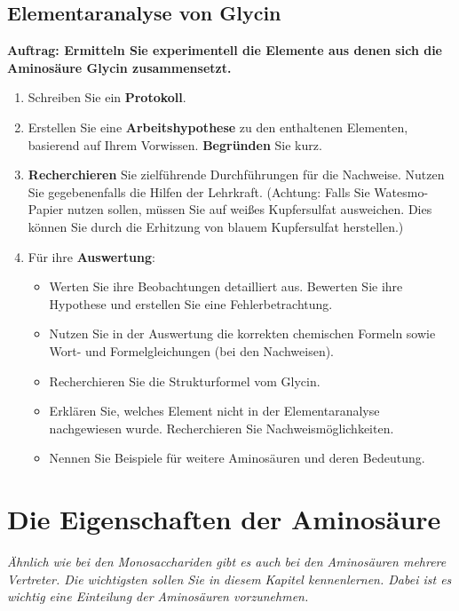 \documentclass{scrartcl}  %
\begin{document}
\newpage
	
		\subsection{Elementaranalyse von Glycin}
		
			\textbf{Auftrag: Ermitteln Sie experimentell die Elemente aus denen sich die Aminosäure Glycin zusammensetzt.}
			
			\begin{enumerate}
				\item Schreiben Sie ein \textbf{Protokoll}.
	    		\item Erstellen Sie eine \textbf{Arbeitshypothese} zu den enthaltenen Elementen, basierend auf Ihrem Vorwissen. \textbf{Begründen} Sie kurz.
	    		\item \textbf{Recherchieren} Sie zielführende Durchführungen für die Nachweise. Nutzen Sie gegebenenfalls die Hilfen der Lehrkraft. (Achtung: Falls Sie Watesmo-Papier nutzen sollen, müssen Sie auf weißes Kupfersulfat ausweichen. Dies können Sie durch die Erhitzung von blauem Kupfersulfat herstellen.)
	    		\item Für ihre \textbf{Auswertung}:
	        	\begin{itemize}
	        		\item Werten Sie ihre Beobachtungen detailliert aus. Bewerten Sie ihre Hypothese und erstellen Sie eine Fehlerbetrachtung. 
	        		\item Nutzen Sie in der Auswertung die korrekten chemischen Formeln sowie Wort- und Formelgleichungen (bei den Nachweisen).
	        		\item Recherchieren Sie die Strukturformel vom Glycin.
	        		\item Erklären Sie, welches Element nicht in der Elementaranalyse nachgewiesen wurde. Recherchieren Sie Nachweismöglichkeiten.
	        		\item Nennen Sie Beispiele für weitere Aminosäuren und deren Bedeutung.
				\end{itemize}
			\end{enumerate}

\newpage
	\section{Die Eigenschaften der Aminosäure}
	
		\textit{Ähnlich wie bei den Monosacchariden gibt es auch bei den Aminosäuren mehrere Vertreter. Die wichtigsten sollen Sie in diesem Kapitel kennenlernen. Dabei ist es wichtig eine Einteilung der Aminosäuren vorzunehmen.} \newline
	
\end{document}

